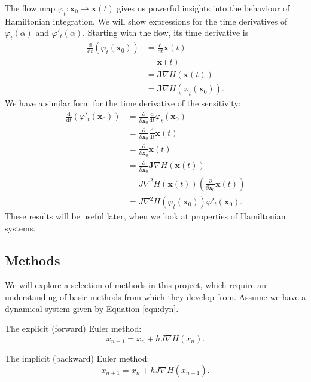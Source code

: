 \documentclass{report}
\theoremstyle{exampstyle} \newtheorem{example}[theorem]{Example}
\theoremstyle{exampstyle} \newtheorem{remark}[theorem]{Remark}
\theoremstyle{exampstyle} \newtheorem{definition}[theorem]{Definition}
\theoremstyle{exampstyle} \newtheorem{lemma}[theorem]{Lemma}
\begin{document}
The flow map $\varphi_t: \mathbf{x}_0 \rightarrow \mathbf{x}(t)$ gives us powerful insights into the behaviour of Hamiltonian integration.
We will show expressions for the time derivatives of $\varphi_t(\alpha)$ and $\varphi'_t(\alpha)$.
Starting with the flow, its time derivative is
\begin{align*}
	\frac{\mathrm{d}}{\mathrm{d}t} \left( \varphi_t(\mathbf{x}_0) \right) &= \frac{\mathrm{d}}{\mathrm{d}t} \mathbf{x}(t) \\
	&= \dot{\mathbf{x}}(t) \\
	&= \mathbf{J}\nabla H(\mathbf{x}(t)) \\
	&= \mathbf{J}\nabla H \left( \varphi_t(\mathbf{x}_0) \right).
\end{align*}
We have a similar form for the time derivative of the sensitivity:
\begin{align*}
	\frac{\mathrm{d}}{\mathrm{d}t} \left( \varphi'_t(\mathbf{x}_0) \right) &= \frac{\partial}{\partial \mathbf{x}_0} \frac{\mathrm{d}}{\mathrm{d}t} \varphi_t(\mathbf{x}_0) \\
	&= \frac{\partial}{\partial \mathbf{x}_0} \frac{\mathrm{d}}{\mathrm{d}t} \mathbf{x}(t) \\
	&= \frac{\partial}{\partial \mathbf{x}_0} \dot{\mathbf{x}}(t) \\
	&= \frac{\partial}{\partial \mathbf{x}_0} \mathbf{J}\nabla H(\mathbf{x}(t)) \\
	&= J \nabla^2 H(\mathbf{x}(t)) \left(\frac{\partial}{\partial \mathbf{x}_0} \mathbf{x}(t)\right) \\
	&= J \nabla^2 H(\varphi_t(\mathbf{x}_0))\varphi'_t(\mathbf{x}_0).
\end{align*}
These results will be useful later, when we look at properties of Hamiltonian systems.

\subsection{Methods}

We will explore a selection of methods in this project,
which require an understanding of basic methods from which they develop from.
Assume we have a dynamical system given by Equation \ref{eqn:dyn}.

The explicit (forward) Euler method:
\begin{equation}
	x_{n+1} = x_n + h J \nabla H(x_n).
\end{equation}

The implicit (backward) Euler method:
\begin{equation}
	x_{n+1} = x_n + h J \nabla H(x_{n+1}).
\end{equation}
\end{document}
